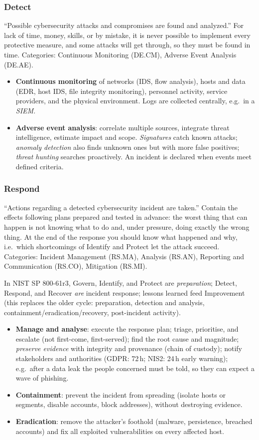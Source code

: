 \subsubsection{Detect}
\enquote{Possible cybersecurity attacks and compromises are found and analyzed.} For lack of time, money, skills, or by mistake, it is never possible to implement every protective measure, and some attacks will get through, so they must be found in time. Categories: Continuous Monitoring (DE.CM), Adverse Event Analysis (DE.AE).
\begin{itemize}
    \item \textbf{Continuous monitoring} of networks (IDS, flow analysis), hosts and data (EDR, host IDS, file integrity monitoring), personnel activity, service providers, and the physical environment. Logs are collected centrally, e.g.\ in a \emph{SIEM}.
    \item \textbf{Adverse event analysis}: correlate multiple sources, integrate threat intelligence, estimate impact and scope. \emph{Signatures} catch known attacks; \emph{anomaly detection} also finds unknown ones but with more false positives; \emph{threat hunting} searches proactively. An incident is declared when events meet defined criteria.
\end{itemize}

\subsubsection{Respond}
\enquote{Actions regarding a detected cybersecurity incident are taken.} Contain the effects following plans prepared and tested in advance: the worst thing that can happen is not knowing what to do and, under pressure, doing exactly the wrong thing. At the end of the response you should know what happened and why, i.e.\ which shortcomings of Identify and Protect let the attack succeed. Categories: Incident Management (RS.MA), Analysis (RS.AN), Reporting and Communication (RS.CO), Mitigation (RS.MI).

In NIST SP 800-61r3, Govern, Identify, and Protect are \emph{preparation}; Detect, Respond, and Recover \emph{are} incident response; lessons learned feed Improvement (this replaces the older cycle: preparation, detection and analysis, containment/eradication/recovery, post-incident activity).
\begin{itemize}
    \item \textbf{Manage and analyse}: execute the response plan; triage, prioritise, and escalate (not first-come, first-served); find the root cause and magnitude; \emph{preserve evidence} with integrity and provenance (chain of custody); notify stakeholders and authorities (GDPR: 72\,h; NIS2: 24\,h early warning); e.g.\ after a data leak the people concerned must be told, so they can expect a wave of phishing.
    \item \textbf{Containment}: prevent the incident from spreading (isolate hosts or segments, disable accounts, block addresses), without destroying evidence.
    \item \textbf{Eradication}: remove the attacker's foothold (malware, persistence, breached accounts) and fix all exploited vulnerabilities on every affected host.
\end{itemize}

